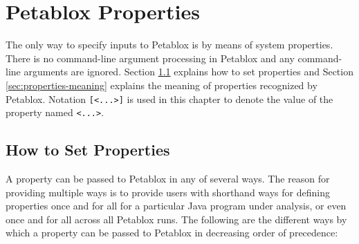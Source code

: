\chapter{Petablox Properties}
\label{chap:properties}

The only way to specify inputs to Petablox is by means of system properties.  There
is no command-line argument processing in Petablox and any command-line arguments
are ignored.  Section \ref{sec:properties-setting} explains how to set
properties and Section \ref{sec:properties-meaning} explains the meaning of
properties recognized by Petablox.
Notation {\tt [<...>]} is used in this chapter to denote the value of the property named {\tt <...>}.

\section{How to Set Properties}
\label{sec:properties-setting}

A property can be passed to Petablox in any of several ways.  The reason for
providing multiple ways is to provide users with shorthand ways for defining
properties once and for all for a particular Java program under analysis, or
even once and for all across all Petablox runs.  The following are the different
ways by which a property can be passed to Petablox in decreasing order of
precedence:

